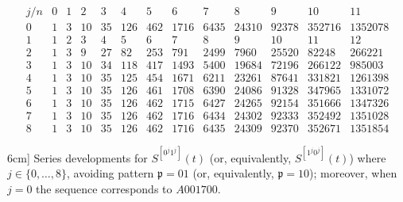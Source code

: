 \begin{table}
\begin{equation*}
\begin{array}{c|cccccccccccc}
    j/n & 0 & 1 & 2 & 3 & 4 & 5 & 6 & 7 & 8 & 9 & 10 & 11\\\hline0 & 1 & 3 & 10 & 35 & 126 & 462 & 1716 & 6435 & 24310 & 92378 & 352716 & 1352078\\1 & 1 & 2 & 3 & 4 & 5 & 6 & 7 & 8 & 9 & 10 & 11 & 12\\2 & 1 & 3 & 9 & 27 & 82 & 253 & 791 & 2499 & 7960 & 25520 & 82248 & 266221\\3 & 1 & 3 & 10 & 34 & 118 & 417 & 1493 & 5400 & 19684 & 72196 & 266122 & 985003\\4 & 1 & 3 & 10 & 35 & 125 & 454 & 1671 & 6211 & 23261 & 87641 & 331821 & 1261398\\5 & 1 & 3 & 10 & 35 & 126 & 461 & 1708 & 6390 & 24086 & 91328 & 347965 & 1331072\\6 & 1 & 3 & 10 & 35 & 126 & 462 & 1715 & 6427 & 24265 & 92154 & 351666 & 1347326\\7 & 1 & 3 & 10 & 35 & 126 & 462 & 1716 & 6434 & 24302 & 92333 & 352492 & 1351028\\8 & 1 & 3 & 10 & 35 & 126 & 462 & 1716 & 6435 & 24309 & 92370 & 352671 & 1351854
\end{array}
\end{equation*}
\caption[Series developments for $S^{[0^{j}1^j]}(t)$ where $j\in \lbrace 0,\ldots,8 \rbrace$.]
        [6cm]{
            Series developments for $S^{[0^{j}1^j]}(t)$ (or, equivalently,
            $S^{[1^{j}0^{j}]}(t)$) where $j\in \lbrace 0,\ldots,8 \rbrace$,
            avoiding pattern $\mathfrak{p}=01$ (or, equivalently,
            $\mathfrak{p}=10$); moreover,
            when $j=0$ the sequence corresponds to $A001700$.
        }
\label{tbl:S0_j:1_j}
\end{table}

